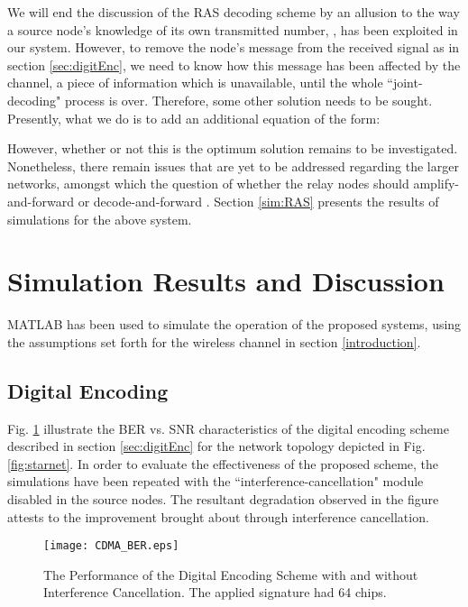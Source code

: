 \documentclass[conference]{IEEEtran}
\begin{document}
We will end the discussion of the RAS decoding scheme by an allusion to the way a source node's knowledge of its own transmitted number, , has been exploited in our system. However, to remove the node's message from the received signal as in section \ref{sec:digitEnc}, we need to know how this message has been affected by the channel, a piece of information which is unavailable, until the whole ``joint-decoding" process is over. Therefore, some other solution needs to be sought. Presently, what we do is to add an additional equation of the form:

However, whether or not this is the optimum solution remains to be investigated. Nonetheless, there remain issues that are yet to be addressed regarding the larger networks, amongst which the question of whether the relay nodes should amplify-and-forward or decode-and-forward \cite{nuzdah}. Section \ref{sim:RAS} presents the results of simulations for the above system.

\section{Simulation Results and Discussion}\label{sec:sim}
MATLAB\textsuperscript{\textregistered} has been used to simulate the operation of the proposed systems, using the assumptions set forth for the wireless channel in section \ref{introduction}.

\subsection{Digital Encoding}\label{sim:dig}
Fig. \ref{fig:digital} illustrate the BER vs. SNR characteristics of the digital encoding scheme described in section \ref{sec:digitEnc} for the network topology depicted in Fig. \ref{fig:starnet}. In order to evaluate the effectiveness of the proposed scheme, the simulations have been repeated with the ``interference-cancellation" module disabled in the source nodes. The resultant degradation observed in the figure attests to the improvement brought about through interference cancellation.

\begin{figure}[tp]
     \centering
           \texttt{[image: CDMA\_BER.eps]}
     \caption{The Performance of the Digital Encoding Scheme with and without Interference Cancellation. The applied signature had 64 chips.}
     \label{fig:digital}
\end{figure}
\end{document}
